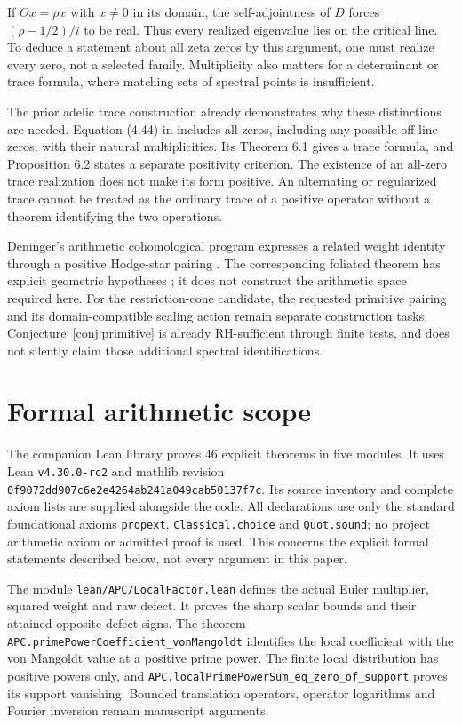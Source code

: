 \documentclass[11pt,letterpaper]{article}
\theoremstyle{definition}
\theoremstyle{remark}
\begin{document}
If $\Theta x=\rho x$ with $x\ne0$ in its domain, the
self-adjointness of $D$ forces $(\rho-1/2)/i$ to be real.
Thus every realized eigenvalue lies on the critical line.
To deduce a statement about all zeta zeros by this argument,
one must realize every zero, not a selected family. Multiplicity
also matters for a determinant or trace formula, where matching
sets of spectral points is insufficient.

The prior adelic trace construction already demonstrates why
these distinctions are needed. Equation (4.44) in \cite{CCMar}
includes all zeros, including any possible off-line zeros,
with their natural multiplicities. Its Theorem 6.1 gives a
trace formula, and Proposition 6.2 states a separate positivity
criterion. The existence of an all-zero trace realization does
not make its form positive. An alternating or regularized trace
cannot be treated as the ordinary trace of a positive operator
without a theorem identifying the two operations.

Deninger's arithmetic cohomological program expresses a related
weight identity through a positive Hodge-star pairing
\cite[Section 3]{D05}. The corresponding foliated theorem has
explicit geometric hypotheses \cite[Theorem 4.1]{D05}; it does
not construct the arithmetic space required here. For the
restriction-cone candidate, the requested primitive pairing
and its domain-compatible scaling action remain separate
construction tasks. Conjecture~\ref{conj:primitive} is already
RH-sufficient through finite tests, and does not silently claim
those additional spectral identifications.

\section{Formal arithmetic scope}

The companion Lean library \cite{APCcode} proves 46 explicit
theorems in five modules. It uses Lean \texttt{v4.30.0-rc2}
and mathlib revision
\nolinkurl{0f9072dd907c6e2e4264ab241a049cab50137f7c}.
Its source inventory and complete axiom lists are supplied
alongside the code. All declarations use only the standard
foundational axioms \texttt{propext}, \texttt{Classical.choice}
and \texttt{Quot.sound}; no project arithmetic axiom or admitted
proof is used. This concerns the explicit formal statements
described below, not every argument in this paper.

The module \nolinkurl{lean/APC/LocalFactor.lean} defines the
actual Euler multiplier, squared weight and raw defect.
It proves the sharp scalar bounds and their attained opposite
defect signs. The theorem
\nolinkurl{APC.primePowerCoefficient_vonMangoldt}
identifies the local coefficient with the von Mangoldt value
at a positive prime power. The finite local distribution has
positive powers only, and
\nolinkurl{APC.localPrimePowerSum_eq_zero_of_support}
proves its support vanishing. Bounded translation operators,
operator logarithms and Fourier inversion remain manuscript
arguments.
\end{document}
